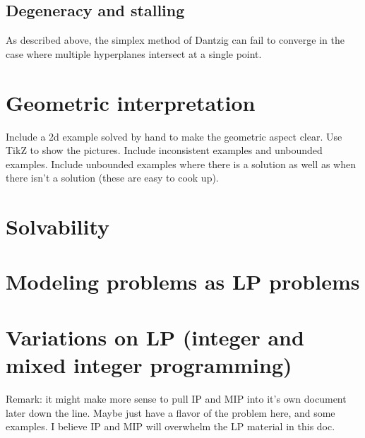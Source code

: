 \documentclass[12pt,english]{article}
\begin{document}
\subsection{Degeneracy and stalling}

As described above, the simplex method of Dantzig can fail to converge in the case where multiple hyperplanes intersect at a single point.  

\section{Geometric interpretation}

Include a 2d example solved by hand to make the geometric aspect clear.  Use TikZ to show the pictures.   Include inconsistent examples and unbounded examples.  Include unbounded examples where there is a solution as well as when there isn't a solution (these are easy to cook up).

\section{Solvability}

\section{Modeling problems as LP problems}

\section{Variations on LP (integer and mixed integer programming)}

Remark: it might make more sense to pull IP and MIP into it's own document later down the line.  Maybe just have a flavor of the problem here, and some examples.  I believe IP and MIP will overwhelm the LP material in this doc.

{}

\end{document}
